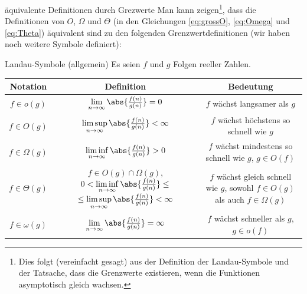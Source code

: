 \begin{frame}{äquivalente Definitionen durch Grezwerte}
Man kann zeigen\footnote{Dies folgt (vereinfacht gesagt) aus der Definition der Landau-Symbole und der Tatsache, dass die Grenzwerte existieren, wenn die Funktionen asymptotisch gleich wachsen.}, dass die Definitionen von $O$, $\Omega$ und $\Theta$ (in den Gleichungen \ref{eq:grossO}, \ref{eq:Omega} und \ref{eq:Theta}) äquivalent sind zu den folgenden Grenzwertdefinitionen (wir haben noch weitere Symbole definiert):
\end{frame}

\begin{frame}{Landau-Symbole (allgemein)}
	Es seien $f$ und $g$ Folgen reeller Zahlen.\\
	\vspace{0.5cm}
	\centering
	\small
	\begin{tabular}{|c|c|c|}
		\hline
		\textbf{Notation} & \textbf{Definition}                                              & \textbf{Bedeutung}                                  \\
		\hline
		$f \in o(g)$      & $\lim\limits_{n \to \infty} \abs{\frac{f(n)}{g(n)}} = 0$         & $f$ wächst langsamer als $g$                        \\
		\hline
		$f \in O(g)$      & $\limsup\limits_{n \to \infty} \abs{\frac{f(n)}{g(n)}} < \infty$ & $f$ wächst höchstens so schnell wie $g$             \\
		\hline
		$f \in \Omega(g)$ & $\liminf\limits_{n \to \infty} \abs{\frac{f(n)}{g(n)}} > 0$      & \makecell{$f$ wächst mindestens so schnell wie $g$, \\$g\in O(f)$}                          \\
		\hline
		$f \in \Theta(g)$ & \makecell{$f \in O(g)\cap \Omega(g)$,                                                                                  \\ $0 < \liminf\limits_{n \to \infty} \abs{\frac{f(n)}{g(n)}} \leq$ \\ $\leq\limsup\limits_{n \to \infty} \abs{\frac{f(n)}{g(n)}} < \infty$} & \makecell{$f$ wächst gleich schnell wie $g$,        \\sowohl $f\in O(g)$ als auch $f\in\Omega(g)$} \\
		\hline
		$f \in \omega(g)$ & $\lim\limits_{n \to \infty} \abs{\frac{f(n)}{g(n)}} = \infty$    & \makecell{$f$ wächst schneller als $g$,             \\$g\in o(f)$}                                      \\
		\hline
	\end{tabular}
\end{frame}

